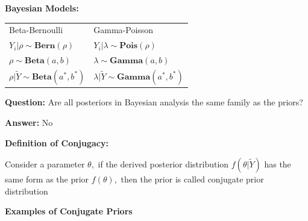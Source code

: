 \documentclass[12pt,xcolor=svgnames]{beamer}
\newcommand{\rd}{\color{red}}
\newcommand{\bl}{\color{blue}}
\newcommand{\theme}{\color{FireBrick}}
\newcommand{\sk}{\vspace{.4cm}}
\newcommand{\nsk}{\vspace{-.4cm}}
\newcommand{\chap}[1]{{\theme \Large \bf #1} \sk}
\begin{document}
\begin{frame}
\chap{Bayesian Models:}

\begin{tabular}{ll}
Beta-Bernoulli & Gamma-Poisson\\
$Y_i|\rho \sim \textbf{Bern}(\rho)$ & $Y_i|\lambda \sim \textbf{Pois}(\rho)$ \\
$\rho \sim \textbf{Beta}(a,b)$ &  $\lambda \sim \textbf{Gamma}(a,b)$\\
$\rho|\tilde{Y} \sim \textbf{Beta}(a^*, b^*)$ & $\lambda|\tilde{Y} \sim \textbf{Gamma}(a^*, b^*)$\\
\end{tabular}
\sk

{\rd \bf Question:} Are all posteriors in Bayesian analysis the same family as the priors?

{\rd \bf Answer:} No 

\end{frame}

\begin{frame}
\chap{Definition of Conjugacy:}

Consider a parameter $\theta,$ if the derived posterior distribution $f(\theta|\tilde{Y})$ has the same form as the prior $f(\theta),$ then the prior is called {\bl conjugate prior distribution} 


\end{frame}

\begin{frame}
\chap{Examples of Conjugate Priors}
\nsk


\end{frame}
\end{document}
